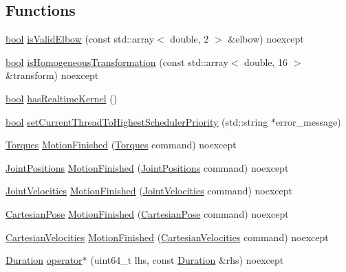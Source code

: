 \subsection*{Functions}
\begin{DoxyCompactItemize}
\item 
\hyperlink{classbool}{bool} \hyperlink{namespacefranka_a4eda3eda0514fabf6d630a6d8c0373a0}{is\+Valid\+Elbow} (const std\+::array$<$ double, 2 $>$ \&elbow) noexcept
\item 
\hyperlink{classbool}{bool} \hyperlink{namespacefranka_ad81c99e8af3f2536ae3c6ec1ce8dce1e}{is\+Homogeneous\+Transformation} (const std\+::array$<$ double, 16 $>$ \&transform) noexcept
\item 
\hyperlink{classbool}{bool} \hyperlink{namespacefranka_ad165a74da105c78586c0cd4c1ed57bd2}{has\+Realtime\+Kernel} ()
\item 
\hyperlink{classbool}{bool} \hyperlink{namespacefranka_a5c090196bc50ead82194d3e594e61e65}{set\+Current\+Thread\+To\+Highest\+Scheduler\+Priority} (std\+::string $\ast$error\+\_\+message)
\item 
\hyperlink{classfranka_1_1Torques}{Torques} \hyperlink{namespacefranka_a20791f7142d78bbbe3c957cc66a23ade}{Motion\+Finished} (\hyperlink{classfranka_1_1Torques}{Torques} command) noexcept
\item 
\hyperlink{classfranka_1_1JointPositions}{Joint\+Positions} \hyperlink{namespacefranka_a7f505509951b6568b08b3aec8ffb9098}{Motion\+Finished} (\hyperlink{classfranka_1_1JointPositions}{Joint\+Positions} command) noexcept
\item 
\hyperlink{classfranka_1_1JointVelocities}{Joint\+Velocities} \hyperlink{namespacefranka_ab478c128d691a46c0ab85bbf3b5caac5}{Motion\+Finished} (\hyperlink{classfranka_1_1JointVelocities}{Joint\+Velocities} command) noexcept
\item 
\hyperlink{classfranka_1_1CartesianPose}{Cartesian\+Pose} \hyperlink{namespacefranka_ab0b308e2a9348fd3eb5fd1d08db12dcf}{Motion\+Finished} (\hyperlink{classfranka_1_1CartesianPose}{Cartesian\+Pose} command) noexcept
\item 
\hyperlink{classfranka_1_1CartesianVelocities}{Cartesian\+Velocities} \hyperlink{namespacefranka_a5898ad5e3bbc2682c24c0415bf7e9a95}{Motion\+Finished} (\hyperlink{classfranka_1_1CartesianVelocities}{Cartesian\+Velocities} command) noexcept
\item 
\hyperlink{classfranka_1_1Duration}{Duration} \hyperlink{namespacefranka_ab3a36a47682756845ef855994aadd7b6}{operator$\ast$} (uint64\+\_\+t lhs, const \hyperlink{classfranka_1_1Duration}{Duration} \&rhs) noexcept

\end{DoxyCompactItemize}
